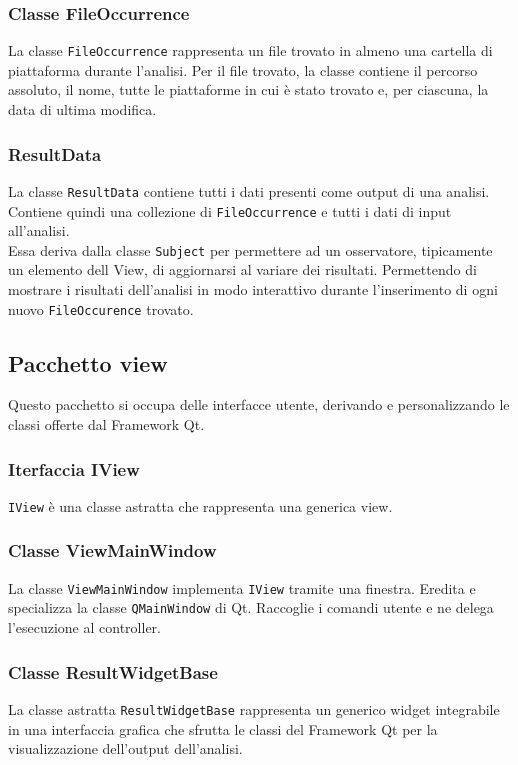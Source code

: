 		\subsubsection{Classe FileOccurrence}
			La classe \texttt{FileOccurrence} rappresenta un file trovato in almeno una cartella di piattaforma durante l'analisi. Per il file trovato, la classe contiene il percorso assoluto, il nome, tutte le piattaforme in cui è stato trovato e, per ciascuna, la data di ultima modifica. 
				
		\subsubsection{ResultData}
			La classe \texttt{ResultData} contiene tutti i dati presenti come output di una analisi. Contiene quindi una collezione di \texttt{FileOccurrence} e tutti i dati di input all'analisi.\\
			Essa deriva dalla classe \texttt{Subject} per permettere ad un osservatore, tipicamente un elemento dell View, di aggiornarsi al variare dei risultati. Permettendo di mostrare i risultati dell'analisi in modo interattivo durante l'inserimento di ogni nuovo \texttt{FileOccurence} trovato.
			
	\subsection{Pacchetto view}
		Questo pacchetto si occupa delle interfacce utente, derivando e personalizzando le classi offerte dal Framework Qt.
		
		\subsubsection{Iterfaccia IView}
			\texttt{IView} è una classe astratta che rappresenta una generica view.
			
		\subsubsection{Classe ViewMainWindow}
			La classe \texttt{ViewMainWindow} implementa \texttt{IView} tramite una finestra. Eredita e specializza la classe \texttt{QMainWindow} di Qt. Raccoglie i comandi utente e ne delega l'esecuzione al controller.
			
		\subsubsection{Classe ResultWidgetBase}
			La classe astratta \texttt{ResultWidgetBase} rappresenta un generico widget integrabile in una interfaccia grafica che sfrutta le classi del Framework Qt per la visualizzazione dell'output dell'analisi.
			
